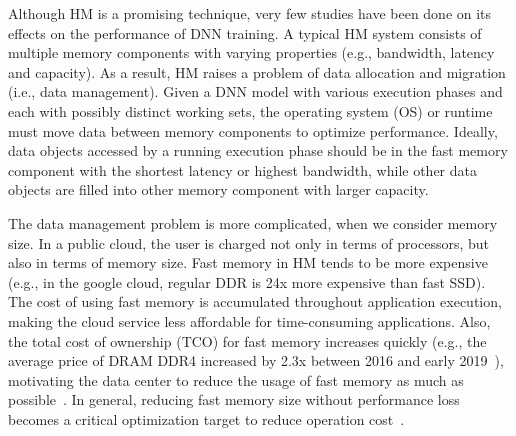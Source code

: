 \textcolor{check}{Although HM is a promising technique, very few studies have been done on its effects on the performance of DNN training. }
A typical HM system consists of multiple memory components with varying properties (e.g., bandwidth, latency and capacity). As a result, HM raises a problem of data allocation and migration (i.e., data management). Given a DNN model with various execution phases and each with possibly distinct working sets, \textcolor{check}{the operating system (OS) or runtime }must move data between memory components to optimize performance. Ideally, data objects accessed by a running execution phase should be in the fast memory component with the shortest latency or highest bandwidth, while other data objects are filled into other memory component with larger capacity. 


The data management problem is more complicated, when we consider memory size. In a public cloud, the user is charged not only in terms of processors, but also in terms of memory size. Fast memory in HM tends to be more expensive (e.g., in the google cloud, regular DDR is 24x more expensive than fast SSD). The cost of using fast memory is accumulated throughout application execution, making the cloud service less affordable for time-consuming applications. Also, the total cost of ownership (TCO) for fast memory increases quickly (e.g., the average price of DRAM DDR4 %
increased by 2.3x between 2016 and early 2019~\cite{ram_price, ram_price2}), motivating the data center to reduce the usage of fast memory as much as possible~\cite{Eisenman:2018:RDF:3190508.3190524}. In general, reducing fast memory size without performance loss becomes a critical optimization target to reduce operation cost~\cite{DBLP:journals/corr/abs-1901-10938, Eisenman:2018:RDF:3190508.3190524}.  

